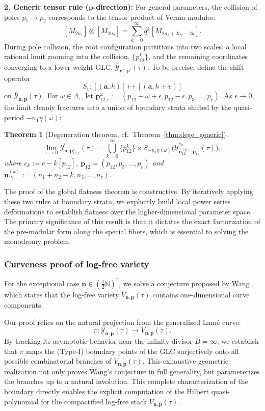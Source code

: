 \documentclass[11pt]{amsart}
\newtheorem{theorem}{Theorem}[section]
\theoremstyle{remark}
\numberwithin{equation}{section}
\begin{document}
\vspace{0.5em}
\noindent \textbf{2. Generic tensor rule ($\mathbf{p}$-direction):} For general parameters, the collision of poles $p_1 \to p_2$ corresponds to the tensor product of Verma modules:
\[
    [M_{2n_1}] \otimes [M_{2n_2}] = \sum_{k=0}^\infty q^k [M_{2n_1+2n_2-2k}].
\]
During pole collision, the root configuration partitions into two scales: a local rational limit zooming into the collision, $\{p_{12}^k\}$, and the remaining coordinates converging to a lower-weight GLC, $\overline{\mathcal{Y}}_{\mathbf{n}',\mathbf{p}'}(\tau)$. To be precise,
define the shift operator 
\[
S_v \colon [(\mathbf{a}, h)] \mapsto [(\mathbf{a}, h+v)]
\]
on $\overline{\mathcal{Y}}_{\mathbf{n},\mathbf{p}}(\tau)$. For $\omega \in \Lambda_\tau$, let $\mathbf{p}_{12, \epsilon}^\omega := (p_{12} + \omega + \epsilon, p_{12} - \epsilon, p_3, \dots, p_r)$. As $\epsilon \to 0$, the limit cleanly fractures into a union of boundary strata shifted by the quasi-period $-n_1\eta(\omega)$:
\begin{theorem}[Degeneration theorem, cf.~Theorem~\ref{thm:dege_generic}]
\[
\lim_{\epsilon \to 0}\overline{\mathcal{Y}}_{\mathbf{n},\mathbf{p}_{12, \epsilon}^\omega}^c(\tau) =
\bigcup_{k=0}^{\infty} \{p_{12}^k\} \times S_{-n_1 \eta(\omega)} \Big( \overline{\mathcal{Y}}^{c_k}_{\mathbf{n}_{12}^{(k)},\mathbf{p}_{12}}(\tau) \Big),
\]
where $c_k := c - k[p_{12}]$, $\mathbf{p}_{12}=(p_{12},p_3,\dots,p_r)$ and $\mathbf{n}_{12}^{(k)} := (n_1+n_2-k,n_3,\dots,n_r)$.
\end{theorem}

The proof of the global flatness theorem is constructive. By iteratively applying these two rules at boundary strata, we explicitly build local power series deformations to establish flatness over the higher-dimensional parameter space. The primary significance of this result is that it dictates the exact factorization of the pre-modular form along the special fibers, which is essential to solving the monodromy problem.


\subsubsection{Curveness proof of log-free variety}
For the exceptional case $\mathbf{n} \in (\tfrac{1}{2}\mathbb{N})^r$, we solve a conjecture proposed by Wang \cite{Wang_2020}, which states that the log-free variety $V_{\mathbf{n},\mathbf{p}}(\tau)$ contains one-dimensional curve components. 

Our proof relies on the natural projection from the generalized Lam\'e curve:
\[
    \pi \colon \mathcal{Y}_{\mathbf{n},\mathbf{p}}(\tau) \longrightarrow V_{\mathbf{n},\mathbf{p}}(\tau).
\]
By tracking its asymptotic behavior near the infinity divisor $B=\infty$, we establish that $\pi$ maps the (Type-I) boundary points of the GLC surjectively onto all possible combinatorial branches of $V_{\mathbf{n},\mathbf{p}}(\tau)$. This exhaustive geometric realization not only proves Wang's conjecture in full generality, but parameterizes the branches up to a natural involution. This complete characterization of the boundary directly enables the explicit computation of the Hilbert quasi-polynomial for the compactified log-free stack $\overline{V}_{\mathbf{n},\mathbf{p}}(\tau)$.
\end{document}
